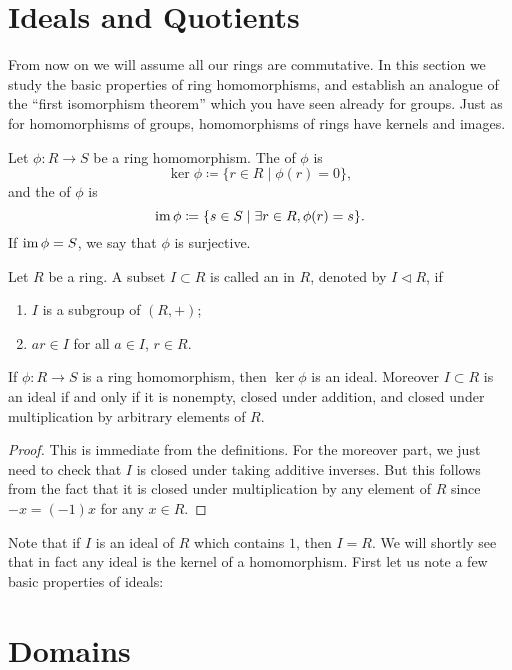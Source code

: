 \section{Ideals and Quotients}
From now on we will assume all our rings are commutative. In this section we study the basic properties of ring homomorphisms, and establish an analogue of the ``first isomorphism theorem'' which you have seen already for groups. Just as for homomorphisms of groups, homomorphisms of rings have kernels and images.

\begin{definition}
Let $\phi:R\to S$ be a ring homomorphism. The  of $\phi$ is
\[\ker\phi\coloneqq\{r\in R\mid\phi(r)=0\},\]
and the  of $\phi$ is
\[\operatorname{im}\phi\coloneqq\{s\in S\mid \exists r\in R, \phi(r)=s\}.\]
If $\operatorname{im}\phi=S$, we say that $\phi$ is surjective.
\end{definition}

\begin{definition}
Let $R$ be a ring. A subset $I\subset R$ is called an  in $R$, denoted by $I\triangleleft R$, if
\begin{enumerate}[label=(\roman*)]
\item $I$ is a subgroup of $(R,+)$;
\item $ar\in I$ for all $a\in I$, $r\in R$.
\end{enumerate}
\end{definition}

\begin{lemma}
If $\phi:R\to S$ is a ring homomorphism, then $\ker\phi$ is an ideal. Moreover $I\subset R$ is an ideal if and only if it is nonempty, closed under addition, and closed under multiplication by arbitrary elements of $R$.
\end{lemma}

\begin{proof}
This is immediate from the definitions. For the moreover part, we just need to check that $I$ is closed under taking additive inverses. But this follows from the fact that it is closed under multiplication by any element of $R$ since $-x=(-1)x$ for any $x\in R$.
\end{proof}

Note that if $I$ is an ideal of $R$ which contains $1$, then $I=R$. We will shortly see that in fact any ideal is the kernel of a homomorphism. First let us note a few basic properties of ideals:


\section{Domains}
